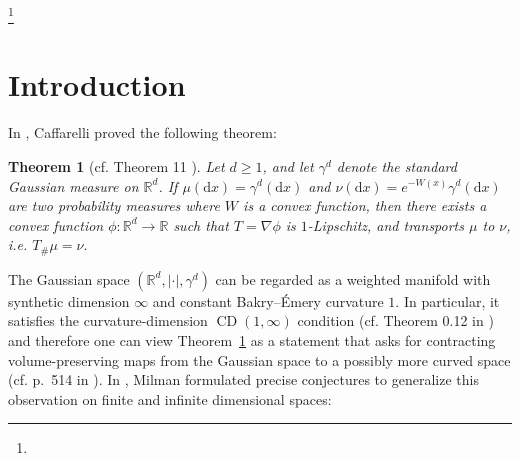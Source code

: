 \documentclass[11pt,reqno]{amsart}
\numberwithin{equation}{section}
\newtheorem{thm}{Theorem}[section]
\theoremstyle{definition}
\theoremstyle{remark}
\newcommand{\R}{\mathbb{R}}
\newcommand{\ud}{\mathrm{d}}
\newcommand{\0}{\emptyset}
\begin{document}
\thanks{}



\maketitle
\section{Introduction} 
In \cite{caffarelli2000monotonicity}, Caffarelli proved the following theorem:
\begin{thm}[cf. Theorem 11 \cite{caffarelli2000monotonicity}]\label{thm:caff}
Let $d\geq 1$, and let $\gamma^d$ denote the standard Gaussian measure on $\R^d$. If $\mu(\ud x)=\gamma^d(\ud x)$ and $\nu(\ud x) = e^{-W(x)} \gamma^d(\ud x)$ are two probability measures where $W$ is a convex function, then there exists a convex function $\phi : \mathbb{R}^d \to \mathbb{R}$ such that $T=\nabla \phi$ is $1$-Lipschitz, and transports $\mu$ to $\nu$, i.e. $T_{\#}\mu =\nu.$
\end{thm}
The Gaussian space \((\R^d,|\cdot|,\gamma^d)\) can be regarded as a weighted
manifold with synthetic dimension \(\infty\) and constant Bakry--\'Emery
curvature \(1\). In particular, it satisfies the curvature-dimension $\operatorname{CD}(1,\infty)$ condition (cf. Theorem 0.12 in \cite{lott2009ricci}) and therefore one can view Theorem~\ref{thm:caff} as a statement that asks for contracting volume-preserving maps from the Gaussian space to a possibly more curved space (cf. p.~514 in \cite{villani2009optimal}). In \cite{milman2018spectral}, Milman formulated precise conjectures to generalize this observation on finite and infinite dimensional spaces:
\end{document}
